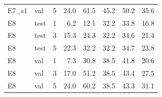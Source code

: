 \begin{table}[t]
\begin{tabular}{llrrrrrr}
E7\_s1 & val & 5 & 24.0 & 61.5 & 45.2 & 50.2 & 35.6 \\
E8 & test & 1 & 6.2 & 12.1 & 32.2 & 33.8 & 16.8 \\
E8 & test & 3 & 15.3 & 24.3 & 32.2 & 34.6 & 21.4 \\
E8 & test & 5 & 22.3 & 32.2 & 32.2 & 34.7 & 23.8 \\
E8 & val & 1 & 7.3 & 30.8 & 38.5 & 41.8 & 20.6 \\
E8 & val & 3 & 17.0 & 51.2 & 38.5 & 43.4 & 27.5 \\
E8 & val & 5 & 24.0 & 60.2 & 38.5 & 43.3 & 31.1 \\
\bottomrule
\end{tabular}
\end{table}
